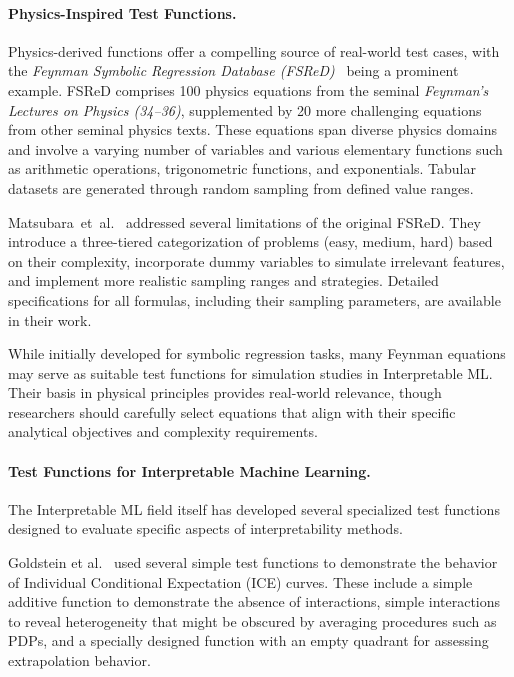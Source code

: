 \documentclass[runningheads]{llncs}
\begin{document}
\paragraph{Physics-Inspired Test Functions.}

Physics-derived functions offer a compelling source of real-world test cases,
with the \textit{Feynman Symbolic Regression Database
    (FSReD)}~\cite{udrescu_ai_2020} being a prominent example. FSReD comprises 100
physics equations from the seminal \textit{Feynman's Lectures on Physics
    (34--36)}, supplemented by 20 more challenging equations from other seminal
physics texts. These equations span diverse physics domains and involve a
varying number of variables and various elementary functions such as arithmetic
operations, trigonometric functions, and exponentials. Tabular datasets are
generated through random sampling from defined value ranges.

Matsubara~et~al.~\cite{matsubara_rethinking_2024} addressed several limitations
of the original FSReD. They introduce a three-tiered categorization of problems
(easy, medium, hard) based on their complexity, incorporate dummy variables to
simulate irrelevant features, and implement more realistic sampling ranges and
strategies. Detailed specifications for all formulas, including their sampling
parameters, are available in their work.

While initially developed for symbolic regression tasks, many Feynman equations
may serve as suitable test functions for simulation studies in Interpretable
ML. Their basis in physical principles provides real-world relevance, though
researchers should carefully select equations that align with their specific
analytical objectives and complexity requirements.

\paragraph{Test Functions for Interpretable Machine Learning.}
The Interpretable ML field itself has developed several specialized test
functions designed to evaluate specific aspects of interpretability methods.

Goldstein et al.~\cite{goldstein_peeking_2015} used several simple test
functions to demonstrate the behavior of Individual Conditional Expectation
(ICE) curves. These include a simple additive function to demonstrate the
absence of interactions, simple interactions to reveal heterogeneity that might
be obscured by averaging procedures such as PDPs, and a specially designed
function with an empty quadrant for assessing extrapolation behavior.
\end{document}
